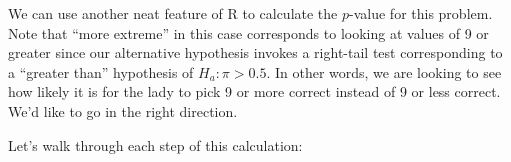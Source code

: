 \documentclass[]{tufte-book}
\newenvironment{Shaded}{\begin{snugshade}}{\end{snugshade}}
\newcommand{\KeywordTok}[1]{\textcolor[rgb]{0.13,0.29,0.53}{\textbf{{#1}}}}
\newcommand{\DecValTok}[1]{\textcolor[rgb]{0.00,0.00,0.81}{{#1}}}
\newcommand{\StringTok}[1]{\textcolor[rgb]{0.31,0.60,0.02}{{#1}}}
\newcommand{\NormalTok}[1]{{#1}}
\begin{document}
We can use another neat feature of R to calculate the \(p\)-value for
this problem. Note that ``more extreme'' in this case corresponds to
looking at values of 9 or greater since our alternative hypothesis
invokes a right-tail test corresponding to a ``greater than'' hypothesis
of \(H_a: \pi > 0.5\). In other words, we are looking to see how likely
it is for the lady to pick 9 or more correct instead of 9 or less
correct. We'd like to go in the right direction.

\begin{Shaded}
\end{Shaded}

Let's walk through each step of this calculation:
\end{document}
